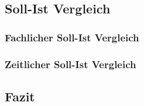 \subsection{Soll-Ist Vergleich}
\subsubsection{Fachlicher Soll-Ist Vergleich}
  \blindtext
\subsubsection{Zeitlicher Soll-Ist Vergleich}
  \blindtext
\subsection{Fazit}
  \blindtext
